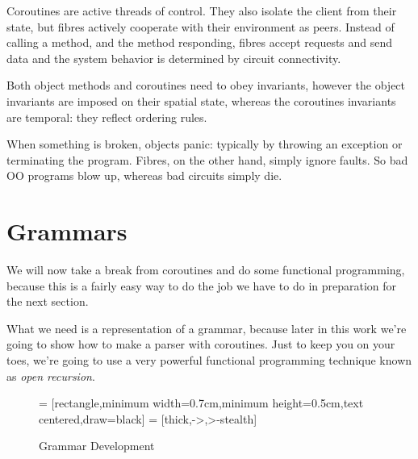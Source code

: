 \documentclass[oneside]{book}
\begin{document}
Coroutines are active threads of control. They also isolate
the client from their state, but fibres actively cooperate
with their environment as peers. Instead of calling a method,
and the method responding, fibres accept requests and send
data and the system behavior is determined by circuit connectivity.

Both object methods and coroutines need to obey invariants,
however the object invariants are imposed on their spatial
state, whereas the coroutines invariants are temporal:
they reflect ordering rules.

When something is broken, objects panic: typically by throwing
an exception or terminating the program. Fibres, on the other
hand, simply ignore faults. So bad OO programs blow up,
whereas bad circuits simply die.

\chapter{Grammars}
We will now take a break from coroutines and do some functional
programming, because this is a fairly easy way to do the job
we have to do in preparation for the next section.

What we need is a representation of a grammar, because later in this
work we're going to show how to make a parser with coroutines.
Just to keep you on your toes, we're going to use a very powerful
functional programming technique known as {\em open recursion}.

\begin{figure}[h]
\begin{center}
 = [rectangle,minimum width=0.7cm,minimum height=0.5cm,text centered,draw=black]
 = [thick,->,>-stealth]
\caption{Grammar Development}
\label{fig:grammar development}
\end{center}
\end{figure}
\end{document}
